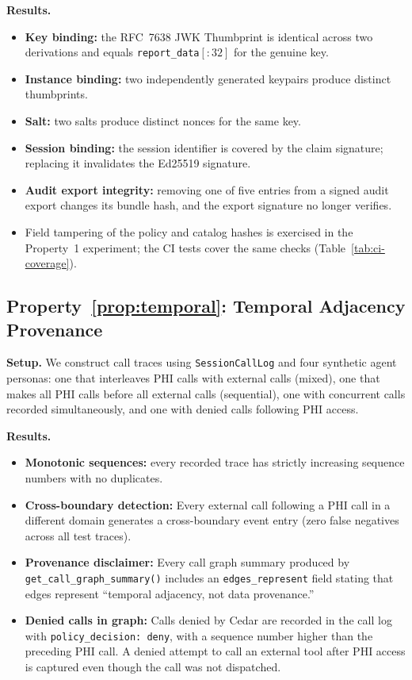 \textbf{Results.}
\begin{itemize}[leftmargin=1.5em]
  \item \textbf{Key binding:} the RFC~7638 JWK Thumbprint is identical across two
    derivations and equals \texttt{report\_data}$[{:}32]$ for the genuine key.
  \item \textbf{Instance binding:} two independently generated keypairs produce distinct
    thumbprints.
  \item \textbf{Salt:} two salts produce distinct nonces for the same key.
  \item \textbf{Session binding:} the session identifier is covered by the claim signature;
    replacing it invalidates the Ed25519 signature.
  \item \textbf{Audit export integrity:} removing one of five entries from a signed audit
    export changes its bundle hash, and the export signature no longer verifies.
  \item Field tampering of the policy and catalog hashes is exercised in the Property~1
    experiment; the CI tests cover the same checks (Table~\ref{tab:ci-coverage}).
\end{itemize}

\subsection{Property~\ref{prop:temporal}: Temporal Adjacency Provenance}

\textbf{Setup.} We construct call traces using \texttt{SessionCallLog} and four synthetic
agent personas: one that interleaves PHI calls with external calls (mixed), one that makes
all PHI calls before all external calls (sequential), one with concurrent calls recorded
simultaneously, and one with denied calls following PHI access.

\textbf{Results.}
\begin{itemize}[leftmargin=1.5em]
  \item \textbf{Monotonic sequences:} every recorded trace has strictly increasing
    sequence numbers with no duplicates.
  \item \textbf{Cross-boundary detection:} Every external call following a PHI call in a
    different domain generates a cross-boundary event entry (zero false negatives across all
    test traces).
  \item \textbf{Provenance disclaimer:} Every call graph summary produced by
    \texttt{get\_call\_graph\_summary()} includes an \texttt{edges\_represent} field stating
    that edges represent ``temporal adjacency, not data provenance.''
  \item \textbf{Denied calls in graph:} Calls denied by Cedar are recorded in the call log
    with \texttt{policy\_decision: deny}, with a sequence number higher than the preceding
    PHI call. A denied attempt to call an external tool after PHI access is captured even
    though the call was not dispatched.
\end{itemize}

